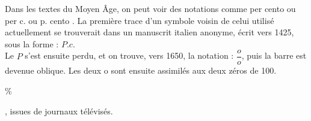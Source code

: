 \vspace*{-5mm}
\begin{changemargin}{-7mm}{-7mm}
    
    \begin{debat} 
        Dans les textes du Moyen Âge, on peut voir des notations comme \og per cento \fg{} ou \og per c. \fg{} ou \og p. cento \fg. La première trace d'un symbole voisin de celui utilisé actuellement se trouverait dans un manuscrit italien anonyme, écrit vers 1425, sous la forme : $P.c$\degre. \\
        Le \og $P$ \fg{} s'est ensuite perdu, et on trouve, vers 1650, la notation : $\dfrac{o}{o}$, puis la barre est devenue oblique. Les deux \og o \fg{} sont ensuite assimilés aux deux zéros de 100. \\
        \begin{center}
           \textcolor{B1}{\fontsize{70}{80}\selectfont \%}
        \end{center}
        \bigskip
        \begin{cadre}[B2][F4]
           \begin{center}
             , issues de journaux télévisés.
           \end{center}
        \end{cadre}
     \end{debat}
\end{changemargin}